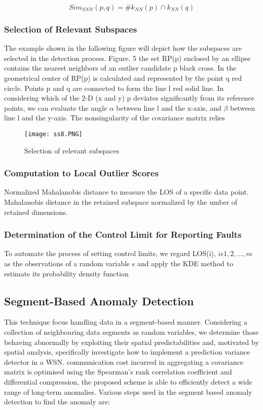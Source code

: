 \documentclass[10pt,a4paper,journal]{IEEEtran}
\begin{document}
\begin{equation}
Sim_{SNN}(p, q) = \#{k_{NN}(p) \cap k_{NN}(q)}
\end{equation}

\subsubsection{Selection of Relevant Subspaces}
The example shown in the following figure will depict how the subspaces are selected in the detection process. Figure. 5 the set RP(p) enclosed by an ellipse contains the nearest neighbors of an outlier candidate p black cross. In the geometrical center of RP(p) is calculated and represented by the point q red circle. Points p and q are connected to form the line l red solid line. In considering which of the 2-D (x and y) p deviates significantly from its reference points, we can evaluate the angle $\alpha$ between line l and the x-axis, and $\beta$ between line l and the y-axis. The nonsingularity of the covariance matrix relies
\begin{figure}[htbp]
	\centering
	\texttt{[image: ss8.PNG]}
	\caption[Selection of relevant subspaces]{Selection of relevant subspaces \cite{3}}
\label{Fig 2}
 \end{figure}
\subsubsection{Computation to Local Outlier Scores}
 Normalized Mahalanobis distance to measure the LOS of a specific
data point. Mahalanobis distance in the retained subspace normalized by the umber of retained dimensions.
\subsubsection {Determination of the Control Limit for Reporting Faults}
To automate the process of setting control limits, we regard LOS(i), $i \epsilon {1, 2, . . . ,m}$ as the observations
of a random variable s and apply the KDE method to estimate
its probability density function 

\subsection{Segment-Based Anomaly Detection}
This technique focus handling data in a segment-based manner. Considering a collection of neighbouring data segments as random variables, we determine those behaving abnormally by exploiting their spatial predictabilities and, motivated by spatial analysis, specifically investigate how to implement a prediction variance detector in a WSN. communication cost incurred in aggregating a covariance matrix is  optimised using the Spearman's rank correlation coefficient and differential compression, the proposed scheme is able to efficiently detect a wide range of long-term anomalies. 
Various steps used in the segment based anomaly detection to find the anomaly are:
\end{document}
